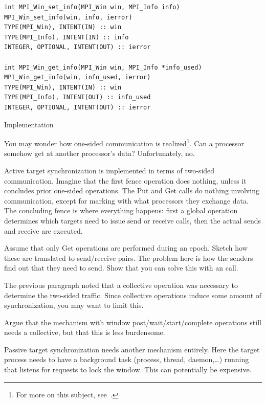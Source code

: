 \begin{verbatim}
int MPI_Win_set_info(MPI_Win win, MPI_Info info)
MPI_Win_set_info(win, info, ierror)
TYPE(MPI_Win), INTENT(IN) :: win
TYPE(MPI_Info), INTENT(IN) :: info
INTEGER, OPTIONAL, INTENT(OUT) :: ierror

int MPI_Win_get_info(MPI_Win win, MPI_Info *info_used)
MPI_Win_get_info(win, info_used, ierror)
TYPE(MPI_Win), INTENT(IN) :: win
TYPE(MPI_Info), INTENT(OUT) :: info_used
INTEGER, OPTIONAL, INTENT(OUT) :: ierror
\end{verbatim}

 {Implementation}

You may wonder how one-sided communication is realized\footnote{For
  more on this subject, see~\cite{thakur:ijhpca-sync}.}. Can a processor
somehow get at another processor's data? Unfortunately, no.

Active target synchronization is implemented in terms of two-sided communication.
Imagine that the first fence operation does nothing, unless it concludes prior
one-sided operations. The Put and Get calls do nothing involving communication,
except for marking with what processors they exchange data.
The concluding fence is where everything happens: first a global operation
determines which targets need to issue send or receive calls, then the
actual sends and receive are executed.

\begin{exercise}
  Assume that only Get operations are performed during an epoch. 
  Sketch how these are translated to send/receive pairs. 
  The problem here is how the senders find out that they need to send.
  Show that you can solve this with an  call.
\end{exercise}

The previous paragraph noted that a collective operation was necessary
to determine the two-sided traffic. Since collective operations induce
some amount of synchronization, you may want to limit this.

\begin{exercise}
  Argue that the mechanism with window post/wait/start/complete operations
  still needs a collective, but that this is less burdensome.
\end{exercise}

Passive target synchronization needs another mechanism entirely.  Here
the target process needs to have a background task (process, thread,
daemon,\ldots) running that listens for requests to lock the
window. This can potentially be expensive.


